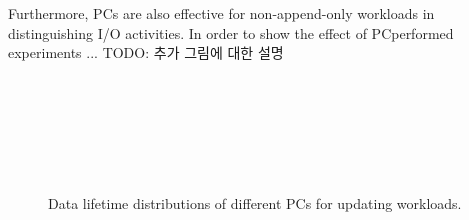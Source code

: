 Furthermore, PCs are also effective for non-append-only workloads
in distinguishing I/O activities. 
In order to show the effect of PCperformed experiments ...
{\color{red} TODO: 추가 그림에 대한 설명 \\ \\ \\ \\ \\ \\ \\}
\begin{figure}[t]
\centering
\hfill
	\hspace{2pt}
\hfill
\vspace{7pt}
	\hspace{2pt}
\caption{Data lifetime distributions of different PCs for updating workloads.} 
\label{fig:types_and_PCs}
\end{figure}



